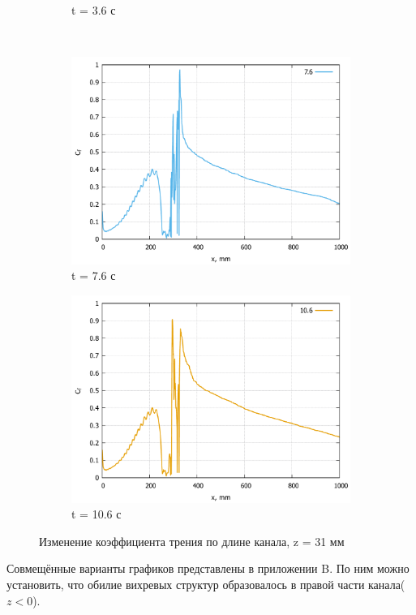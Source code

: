 \begin{figure}[H]
\begin{subfigure}{.5\textwidth}
			\caption{t = 3.6 с}
			\label{fig:Cf-T360-31p}
		\end{subfigure}
		\\
		\begin{subfigure}{.5\textwidth}
			\centering
			\includegraphics[width=1\linewidth]{../Assets/Cf-T760-31p}
			\caption{t = 7.6 с}
			\label{fig:Cf-T760-31p}
		\end{subfigure}%
		\begin{subfigure}{.5\textwidth}
			\centering
			\includegraphics[width=1\linewidth]{../Assets/Cf-T1060-31p}
			\caption{t = 10.6 с}
			\label{fig:Cf-T1060-31p}
		\end{subfigure}
		\caption{Изменение коэффициента трения по длине канала, z = 31 мм}
		\label{fig:cf-31p}
	\end{figure}
	Совмещённые варианты графиков представлены в приложении B. По ним можно установить, что обилие вихревых структур образовалось в правой части канала($z < 0$). 
